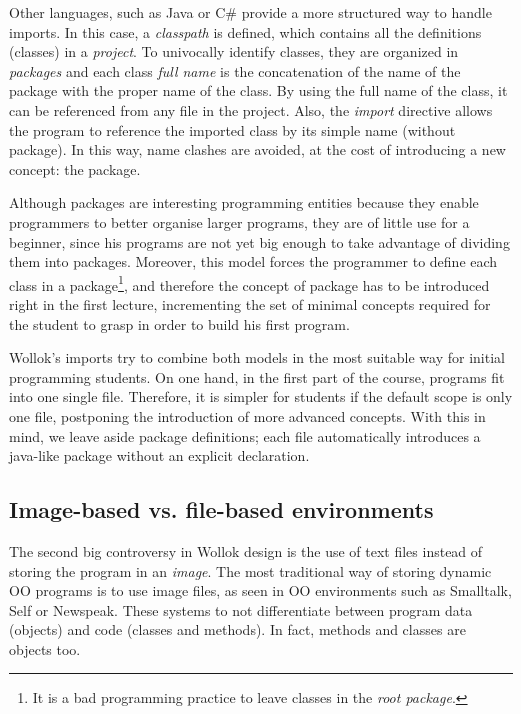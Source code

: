 Other languages, such as Java or C\# provide a more structured way to handle imports. 
In this case, a \emph{classpath} is defined, which contains all the definitions (\ie classes) in a \emph{project}.
To univocally identify classes, they are organized in \emph{packages} and each class \emph{full name} is the concatenation of the name of the package with the proper name of the class.
By using the full name of the class, it can be referenced from any file in the project.
Also, the \emph{import} directive allows the program to reference the imported class by its simple name (without package).
In this way, name clashes are avoided, at the cost of introducing a new concept: the package.

Although packages are interesting programming entities because they enable programmers to better organise larger programs, 
they are of little use for a beginner, since his programs are not yet big enough to take advantage of dividing them into packages.
Moreover, this model forces the programmer to define each class in a package\footnote{It is a bad programming practice to leave classes in the \emph{root package}.}, 
and therefore the concept of package has to be introduced right in the first lecture, 
incrementing the set of minimal concepts required for the student to grasp in order to build his first program.

\medskip

Wollok's imports try to combine both models in the most suitable way for initial programming students.
On one hand, in the first part of the course, programs fit into one single file. 
Therefore, it is simpler for students if the default scope is only one file, postponing the introduction of more advanced concepts.
With this in mind, we leave aside package definitions; each file automatically introduces a java-like package without an explicit declaration.

\subsection{Image-based vs. file-based environments}
\label{sec:file-based}
The second big controversy in Wollok design is the use of text files instead of storing the program in an \emph{image}.
The most traditional way of storing dynamic OO programs is to use image files, as seen in OO environments such as Smalltalk, Self or Newspeak.
These systems to not differentiate between program data (objects) and code (classes and methods). 
In fact, methods and classes are objects too.

